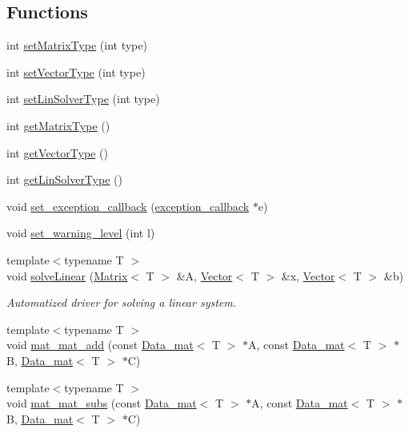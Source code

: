 \subsection*{Functions}
\begin{DoxyCompactItemize}
\item 
int \hyperlink{namespacelmx_aed2ebd81147c916e464de06ee37aa756}{set\-Matrix\-Type} (int type)
\item 
int \hyperlink{namespacelmx_a9dfd59f1cf0bfa5c7cc217f0201033e6}{set\-Vector\-Type} (int type)
\item 
int \hyperlink{namespacelmx_a3b4317f361bcc93a74ead7490f0265a4}{set\-Lin\-Solver\-Type} (int type)
\item 
int \hyperlink{namespacelmx_a2aca178888955f2289a8d3d6e5c58fd0}{get\-Matrix\-Type} ()
\item 
int \hyperlink{namespacelmx_a65ad7b9cfa290037192cc3147ca508d5}{get\-Vector\-Type} ()
\item 
int \hyperlink{namespacelmx_a92e4bebee5d9aabe5807c30fab96e192}{get\-Lin\-Solver\-Type} ()
\item 
void \hyperlink{namespacelmx_a9ec7e30ade7c87eaf14dfee79807c402}{set\-\_\-exception\-\_\-callback} (\hyperlink{structlmx_1_1exception__callback}{exception\-\_\-callback} $\ast$e)
\item 
void \hyperlink{namespacelmx_a8b100980a9fd681c507d233fc8e4250c}{set\-\_\-warning\-\_\-level} (int l)
\item 
{\footnotesize template$<$typename T $>$ }\\void \hyperlink{namespacelmx_a992f0b2fbca043dfcda66af0ab4e0c22}{solve\-Linear} (\hyperlink{classlmx_1_1Matrix}{Matrix}$<$ T $>$ \&A, \hyperlink{classlmx_1_1Vector}{Vector}$<$ T $>$ \&x, \hyperlink{classlmx_1_1Vector}{Vector}$<$ T $>$ \&b)
\begin{DoxyCompactList}\small\item\em Automatized driver for solving a linear system. \end{DoxyCompactList}\item 
{\footnotesize template$<$typename T $>$ }\\void \hyperlink{namespacelmx_a5c05859eb44b6c663c19d8e3d1cd4336}{mat\-\_\-mat\-\_\-add} (const \hyperlink{classlmx_1_1Data__mat}{Data\-\_\-mat}$<$ T $>$ $\ast$A, const \hyperlink{classlmx_1_1Data__mat}{Data\-\_\-mat}$<$ T $>$ $\ast$B, \hyperlink{classlmx_1_1Data__mat}{Data\-\_\-mat}$<$ T $>$ $\ast$C)
\item 
{\footnotesize template$<$typename T $>$ }\\void \hyperlink{namespacelmx_adee3572a0c0df7bd840c2a4c2eab80b0}{mat\-\_\-mat\-\_\-subs} (const \hyperlink{classlmx_1_1Data__mat}{Data\-\_\-mat}$<$ T $>$ $\ast$A, const \hyperlink{classlmx_1_1Data__mat}{Data\-\_\-mat}$<$ T $>$ $\ast$B, \hyperlink{classlmx_1_1Data__mat}{Data\-\_\-mat}$<$ T $>$ $\ast$C)

\end{DoxyCompactItemize}
